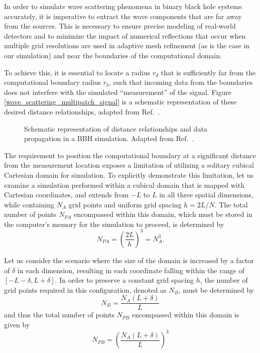 In order to simulate wave scattering phenomena in binary black hole systems accurately, it is imperative to extract the wave components that are far away from the sources. This is necessary to ensure precise modeling of real-world detectors and to minimize the impact of numerical reflections that occur when multiple grid resolutions are used in adaptive mesh refinement (as is the case in our simulation) and near the boundaries of the computational domain.

To achieve this, it is essential to locate a radius $r_d$ that is sufficiently far from the computational boundary radius $r_b$, such that incoming data from the boundaries does not interfere with the simulated ``measurement'' of the signal. Figure \ref{wave_scattering_multipatch_signal} is a schematic representation of these desired distance relationships, adapted from Ref.~\cite{Reisswig2010}.

\begin{figure}[h]
  \centering
  
  \caption{Schematic representation of distance relationships and data propagation in a BBH simulation. Adapted from Ref.~\cite{Reisswig2010}.}
  \label{fig:wave_scattering_multipatch_signal}
\end{figure}

The requirement to position the computational boundary at a significant distance from the measurement location exposes a limitation of utilizing a solitary cubical Cartesian domain for simulation. To explicitly demonstrate this limitation, let us examine a simulation performed within a cubical domain that is mapped with Cartesian coordinates, and extends from $-L$ to $L$ in all three spatial dimensions, while containing $N_A$ grid points and uniform grid spacing $h=2L/N$. The total number of points $N_{PA}$ encompassed within this domain, which must be stored in the computer's memory for the simulation to proceed, is determined by
%
\begin{equation}
  N_{PA} = \left( \frac{2L}{h} \right)^3 = N_A^3.
  \label{eq:wave_scattering_npa}
\end{equation}

Let us consider the scenario where the size of the domain is increased by a factor of $\delta$ in each dimension, resulting in each coordinate falling within the range of $[-L-\delta, L+\delta]$. In order to preserve a constant grid spacing $h$, the number of grid points required in this configuration, denoted as $N_B$, must be determined by
%
\begin{equation}
  N_{B} = \frac{N_A(L + \delta)}{L}
  \label{eq:wave_scattering_nb}
\end{equation}
%
and thus the total number of points $N_{PB}$ encompassed within this domain is given by
%
\begin{equation}
  N_{PB} = \left(\frac{N_A(L + \delta)}{L}\right)^3
  \label{eq:wave_scattering_npb}
\end{equation}

